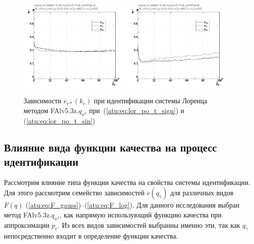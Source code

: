 \begin{figure}[h!]
  \centerline{
    \includegraphics[width=0.49\textwidth]{p/cha/lor/FAlv5.3z/lor_FAlv5_3z_qx2-p_ke_e_sign.png}
    \hfill
    \includegraphics[width=0.49\textwidth]{p/cha/lor/FAlv5.3z/lor_FAlv5_3z_qx2-p_ke_e_sin.png}
  }
  \caption{Зависимости $\overline{e}_{r*}(k_e)$ при идентификации системы Лоренца методом FAlv5.3z.$q_{x^2}$
   при~(\ref{atu:eq:lor_po_t_sign}) и (\ref{atu:eq:lor_po_t_sin})}
  \label{atu:f:lor_ke_FAlv5.3z.q_x2}
\end{figure}


\subsection{Влияние вида функции качества на процесс идентификации}

Рассмотрим влияние типа функции качества на свойства системы идентификации.
Для этого рассмотрим семейство зависимостей
$\overline{e}(q_\gamma)$ для различных видов $F(q)$
(\ref{atu:eq:F_gauss})--(\ref{atu:eq:F_log}).
Для данного исследования выбран метод FAlv5.3z.$q_{x^2}$,
как напрямую использующий функцию качества при
аппроксимации $p_e$.
Из всех видов зависимостей выбранны именно эти,
так как $q_\gamma$ непосредственно входит в определение функции качества.


